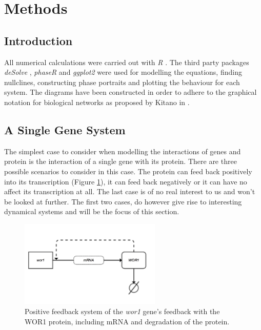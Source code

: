 \documentclass[]{article}
\begin{document}
\section{Methods}
        \subsection{Introduction}
        All numerical calculations were carried out with \textit{R} \cite{R}. The third party packages \textit{deSolve} \cite{deSolve}, \textit{phaseR} \cite{phaseR} and \textit{ggplot2} \cite {ggplot} were used for modelling the equations, finding nullclines, constructing phase portraits and plotting the behaviour for each system. The diagrams have been constructed in order to adhere to the graphical notation for biological networks as proposed by Kitano in \cite{standardNotation}.
	            
        \subsection{A Single Gene System} 
        The simplest case to consider when modelling the interactions of genes and protein is the interaction of a single gene with its protein. There are three possible scenarios to consider in this case. The protein can feed back positively into its transcription (Figure \ref{singlePositive}), it can feed back negatively or it can have no affect its transcription at all. The last case is of no real interest to us and won't be looked at further. The first two cases, do however give rise to interesting dynamical systems and will be the focus of this section. 
        	     
        \begin{figure}[h]
        \centering
        \includegraphics[width=0.6\textwidth]{./figures/singlePositive.png}
        \caption{Positive feedback system of the \textit{wor1} gene's feedback with the WOR1 protein, including mRNA and degradation of the protein.}
        \label{singlePositive}
        \end{figure}            
\end{document}
